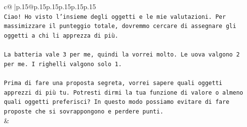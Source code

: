 \documentclass{article}
\begin{document}
{\begin{supertabular}{c@{$\;$}|p{.15\linewidth}@{}p{.15\linewidth}p{.15\linewidth}p{.15\linewidth}p{.15\linewidth}p{.15\linewidth}}
{{{\\ 
\texttt{Ciao! Ho visto l'insieme degli oggetti e le mie valutazioni. Per massimizzare il punteggio totale, dovremmo cercare di assegnare gli oggetti a chi li apprezza di più.} \\
\\ 
\texttt{La batteria vale 3 per me, quindi la vorrei molto. Le uova valgono 2 per me. I righelli valgono solo 1.} \\
\\ 
\texttt{Prima di fare una proposta segreta, vorrei sapere quali oggetti apprezzi di più tu. Potresti dirmi la tua funzione di valore o almeno quali oggetti preferisci? In questo modo possiamo evitare di fare proposte che si sovrappongono e perdere punti.} \\
            }
        }
    }
    & \\ \\


\end{supertabular}}
\end{document}
